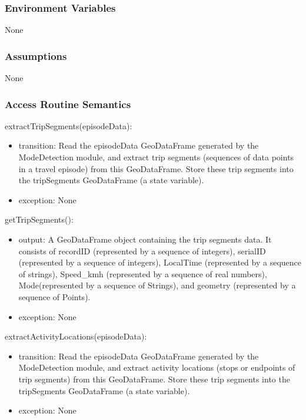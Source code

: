 \documentclass[12pt, titlepage]{article}
\begin{document}
\subsubsection{Environment Variables}

None

\subsubsection{Assumptions}

None

\subsubsection{Access Routine Semantics}

\noindent extractTripSegments(episodeData):
\begin{itemize}
\item transition: Read the episodeData GeoDataFrame generated by the ModeDetection module, and extract trip segments (sequences of data points in a travel episode) from this GeoDataFrame. Store these trip segments into the tripSegments GeoDataFrame (a state variable).
\item exception: None
\end{itemize}

\noindent getTripSegments():
\begin{itemize}
\item output: A GeoDataFrame object containing the trip segments data.  It consists of recordID (represented by a sequence of integers), serialID (represented by a sequence of integers), LocalTime (represented by a sequence of strings), Speed\_kmh (represented by a sequence of real numbers), Mode(represented by a sequence of Strings), and geometry (represented by a sequence of Points).
\item exception: None
\end{itemize}


\noindent extractActivityLocations(episodeData):
\begin{itemize}
\item transition: Read the episodeData GeoDataFrame generated by the ModeDetection module, and extract activity locations (stops or endpoints of trip segments) from this GeoDataFrame. Store these trip segments into the tripSegments GeoDataFrame (a state variable).
\item exception: None
\end{itemize}
\end{document}
